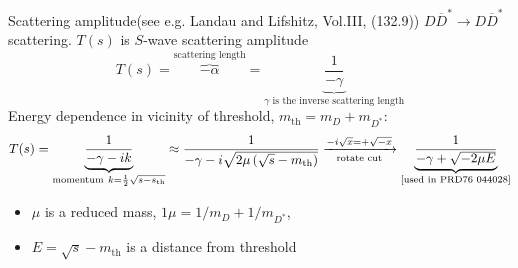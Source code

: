 \documentclass[aspectratio=169]{beamer}
\begin{document}
\begin{frame}[noframenumbering]{Scattering amplitude}{(see e.g. Landau and Lifshitz, Vol.III, (132.9))}
$D\overline{D}^* \to D\overline{D}^*$ scattering. $T(s)$ is $S$-wave scattering amplitude
\begin{equation*}
    T(s)
    = \overbrace{-\alpha}^{\text{scattering length}}
    = \underbrace{\frac{1}{-\gamma}}_{\gamma \text{ is the inverse scattering length}}
\end{equation*}
Energy dependence in vicinity of threshold, $m_\text{th} = m_D+m_{D^*}$:
\begin{equation*}
    T(s) = \underbrace{\frac{1}{-\gamma-i k}}_{\text{momentum}~k = \frac{1}{2}\sqrt{s-s_\text{th}}} \approx
        \frac{1}{-\gamma-i\sqrt{2\mu\,(\sqrt{s}-m_\text{th})}}
    \xrightarrow[\text{rotate cut}]{-i\sqrt{x} =+\sqrt{-x}}
    \underbrace{
        \frac{1}{-\gamma+\sqrt{-2\mu E}}
        }_{\tiny[\text{used in PRD76 044028}]}
\end{equation*}
\begin{itemize}
    \item $\mu$ is a reduced mass, $1\mu  = 1/m_D + 1/m_{D^*}$,\\
    \item $E = \sqrt{s}-m_\text{th}$ is a distance from threshold
\end{itemize}
\end{frame}
\end{document}
